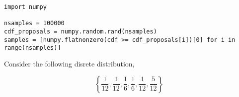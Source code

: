 \documentclass[12pt]{article}
\begin{document}
\iftex
\begin{verbatim}
import numpy

nsamples = 100000
cdf_proposals = numpy.random.rand(nsamples)
samples = [numpy.flatnonzero(cdf >= cdf_proposals[i])[0] for i in range(nsamples)]
\end{verbatim}
\fi

Consider the following disrete distribution,

\begin{equation} \label{eq:discrete}
\left \{\frac{1}{12}, \frac{1}{12}, \frac{1}{6}, \frac{1}{6}, \frac{1}{12}, \frac{5}{12} \right\}
\end{equation}
\end{document}
